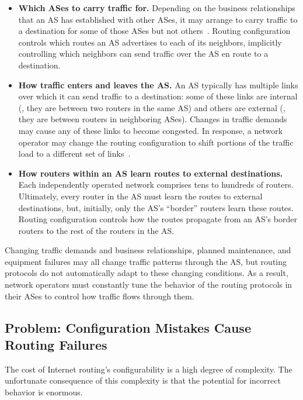 \begin{itemize}
\item {\bf Which ASes to carry traffic for.}  Depending on the
  business relationships that an AS has established with other
  ASes, it may arrange to carry traffic to a destination for some of
  those ASes but not others~\cite{Gao2001a}.  Routing configuration
  controls which routes an AS advertises to each of its neighbors,
  implicitly controlling which neighbors can send traffic over the
  AS en route to a destination.

\item {\bf How traffic enters and leaves the AS.} An AS
  typically has multiple links over which it can send traffic to a
  destination: some of these links are internal (\ie,
  they are between two routers in the same AS) and others are
  external (\ie, they are between routers in neighboring ASes).
  Changes in traffic demands may cause any of these links to become
  congested.  In response, a network operator may change the routing
  configuration to shift portions of the traffic load to a different set
  of links~\cite{Feamster2002b}. 

\item {\bf How routers within an AS learn routes to external
  destinations.}  Each independently operated network comprises tens to
  hundreds of routers.  Ultimately, every router in the AS must
  learn the routes to external destinations, but, initially, only the
  AS's ``border'' routers learn these routes.  Routing
  configuration controls how the routes propagate from an AS's
  border routers to the rest of the routers in the AS.
\end{itemize}


Changing traffic demands and business relationships, planned
maintenance, and equipment failures may all change traffic patterns
through the AS, but routing protocols do not automatically adapt to
these changing conditions.
As a
result, network operators must constantly tune the behavior of the
routing protocols in their ASes to control how traffic flows through
them.  

\subsection{Problem: Configuration Mistakes Cause Routing Failures}
\label{sec:intro:problem}

The cost of Internet routing's
configurability is a high degree of complexity.  The unfortunate
consequence of this complexity is that the potential for incorrect
behavior is enormous.


